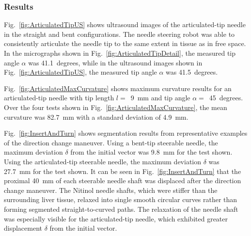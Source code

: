 \subsubsection{Results}
Fig.~\ref{fig:ArticulatedTipUS} shows ultrasound images of the articulated-tip needle in the straight and bent configurations. The needle steering robot was able to consistently articulate the needle tip to the same extent in tissue as in free space. In the micrographs shown in Fig.~\ref{fig:ArticulatedTipDetail}, the measured tip angle $\alpha$ was 41.1~degrees, while in the ultrasound images shown in Fig.~\ref{fig:ArticulatedTipUS}, the measured tip angle $\alpha$ was 41.5~degrees.

Fig.~\ref{fig:ArticulatedMaxCurvature} shows maximum curvature results for an articulated-tip needle with tip length $l =$~9~mm and tip angle $\alpha =$~45~degrees. Over the four tests shown in Fig.~\ref{fig:ArticulatedMaxCurvature}, the mean curvature was 82.7~mm with a standard deviation of 4.9~mm.       

Fig.~\ref{fig:InsertAndTurn} shows segmentation results from representative examples of the direction change maneuver. Using a bent-tip steerable needle, the maximum deviation $\delta$ from the initial vector was 9.8~mm for the test shown. Using the articulated-tip steerable needle, the maximum deviation $\delta$ was 27.7~mm for the test shown. It can be seen in Fig.~\ref{fig:InsertAndTurn} that the proximal 40~mm of each steerable needle shaft was displaced after the direction change maneuver. The Nitinol needle shafts, which were stiffer than the surrounding liver tissue, relaxed into single smooth circular curves rather than forming segmented straight-to-curved paths. The relaxation of the needle shaft was especially visible for the articulated-tip needle, which exhibited greater displacement $\delta$ from the initial vector.

